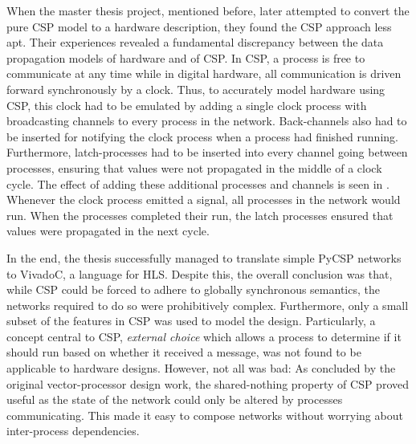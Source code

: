 When the master thesis project, mentioned before, later attempted to convert the pure
CSP model to a hardware description, they found the CSP approach less apt.
Their experiences revealed a fundamental discrepancy between the data
propagation models of hardware and of CSP. In CSP, a process is free to
communicate at any time while in digital hardware, all communication is driven
forward synchronously by a clock.
Thus, to accurately model hardware using CSP, this clock had to be emulated by
adding a single clock process with broadcasting channels to every process in the
network. Back-channels also had to be inserted for notifying
the clock process when a process had finished running. Furthermore,
latch-processes had to be inserted into every channel going between processes,
ensuring that values were not propagated in the middle of a clock cycle. The
effect of adding these additional processes and channels is seen in
. Whenever the clock process emitted a signal, all processes
in the network would run. When the processes completed their run, the latch
processes ensured that values were propagated in the next cycle.

In the end, the thesis successfully managed to translate simple PyCSP networks
to VivadoC, a language for HLS. Despite this, the overall conclusion was that,
while CSP could be forced to adhere to globally synchronous semantics, the
networks required to do so were prohibitively complex. Furthermore, only a small
subset of the features in CSP was used to model the design. Particularly, a
concept central to CSP, \textit{external choice} which allows a process to
determine if it should run based on whether it received a message, was not found
to be applicable to hardware designs. However, not all was bad: As concluded by
the original vector-processor design work, the shared-nothing property of CSP
proved useful as the state of the network could only be altered by processes
communicating. This made it easy to compose networks without worrying about
inter-process dependencies.

